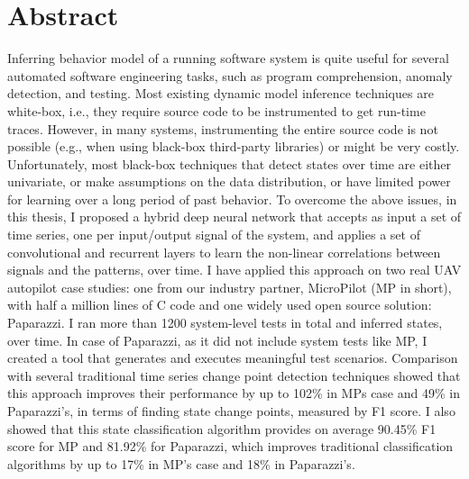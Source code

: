 
\chapter{Abstract}
Inferring behavior model of a running software system is quite useful for several automated software engineering tasks, such as program comprehension, anomaly detection, and testing. Most existing dynamic model inference techniques are white-box, i.e., they require source code to be instrumented to get run-time traces. However, in many systems, instrumenting the entire source code is not possible (e.g., when using black-box third-party libraries) or might be very costly. %
Unfortunately, most black-box techniques that detect states over time are either univariate, or make assumptions on the data distribution, or have limited power for learning over a long period of past behavior. 
To overcome the above issues, in this thesis, I proposed a hybrid deep neural network that accepts as input a set of time series, one per input/output signal of the system, and applies a set of convolutional and recurrent layers to learn the non-linear correlations between signals and the patterns, over time. 
I have applied this approach on two real UAV autopilot case studies: one from our industry partner, MicroPilot (MP in short), with half a million lines of C code and one widely used open source solution: Paparazzi. 
I ran more than 1200 system-level tests in total and inferred states, over time.
In case of Paparazzi, as it did not include system tests like MP, I created a tool that generates and executes meaningful test scenarios.
Comparison with several traditional time series change point detection techniques showed that this approach improves their performance by up to 102\% in MPs case and 49\% in Paparazzi's, in terms of finding state change points, measured by F1 score. I also showed that this state classification algorithm provides on average 90.45\% F1 score for MP and 81.92\% for Paparazzi, which improves traditional classification algorithms by up to 17\% in MP's case and 18\% in Paparazzi's.


